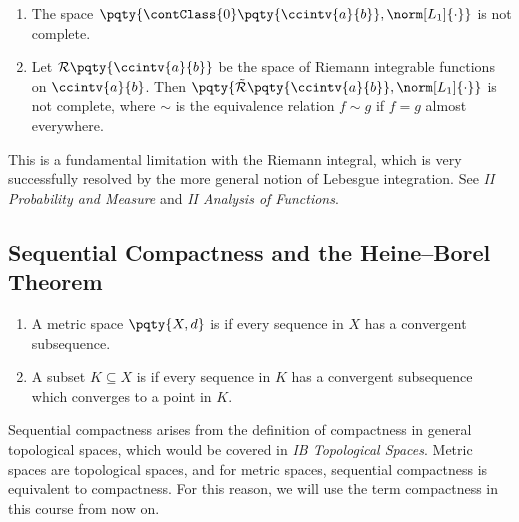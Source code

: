 \begin{example}
    \begin{enumerate}[label=(\roman*)]
        \item The space \(\pqty{\contClass{0}\pqty{\ccintv{a}{b}}, \norm[L_1]{\cdot}}\) is not complete.
        \item Let \(\mathcal{R}\pqty{\ccintv{a}{b}}\) be the space of Riemann integrable functions on \(\ccintv{a}{b}\). Then \(\pqty{\tilde{\mathcal{R}}\pqty{\ccintv{a}{b}}, \norm[L_1]{\cdot}}\) is not complete, where \(\sim\) is the equivalence relation \(f \sim g\) if \(f = g\) almost everywhere.
    \end{enumerate}

    \small

    This is a fundamental limitation with the Riemann integral, which is very successfully resolved by the more general notion of Lebesgue integration. See \textit{II Probability and Measure} and \textit{II Analysis of Functions}.

    \normalsize
\end{example}

\subsection{Sequential Compactness and the Heine--Borel Theorem}

\begin{definition}
    \begin{enumerate}[label=(\roman*)]
        \item A metric space \(\pqty{X, d}\) is  if every sequence in \(X\) has a convergent subsequence.
        \item A subset \(K \subseteq X\) is  if every sequence in \(K\) has a convergent subsequence which converges to a point in \(K\).
    \end{enumerate}
\end{definition}

\begin{remark}
    Sequential compactness arises from the definition of compactness in general topological spaces, which would be covered in \textit{IB Topological Spaces}. Metric spaces are topological spaces, and for metric spaces, sequential compactness is equivalent to compactness. For this reason, we will use the term compactness in this course from now on.
\end{remark}

